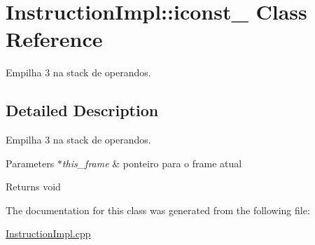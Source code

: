 \hypertarget{class_instruction_impl_1_1iconst__3}{}\section{Instruction\+Impl\+:\+:iconst\+\_ Class Reference}
\label{class_instruction_impl_1_1iconst__3}


Empilha 3 na stack de operandos.  




\subsection{Detailed Description}
Empilha 3 na stack de operandos. 


\begin{DoxyParams}{Parameters}
{\em $\ast$this\+\_\+frame} & ponteiro para o frame atual \\
\hline
\end{DoxyParams}
\begin{DoxyReturn}{Returns}
void 
\end{DoxyReturn}


The documentation for this class was generated from the following file\+:\begin{DoxyCompactItemize}
\item 
\hyperlink{_instruction_impl_8cpp}{Instruction\+Impl.\+cpp}\end{DoxyCompactItemize}
